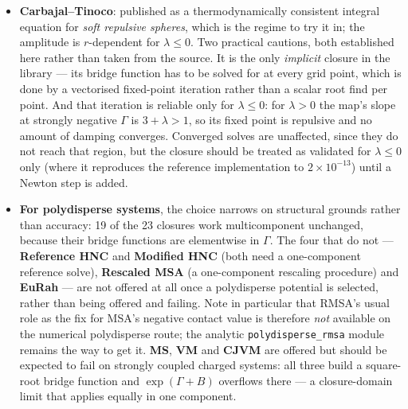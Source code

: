 \documentclass[11pt,a4paper]{article}
\newcommand{\code}[1]{\texttt{#1}}
\begin{document}
\begin{itemize}[nosep]
    RY \emph{exactly} (verified here to $2.5\times10^{-16}$). Its value is
    precisely that second degree of freedom: where RY's own consistency
    search finds no root -- which happens, since the residual is often
    monotone and already nonzero in the PY limit
    (Section~\ref{sec:alpha}) -- the extra parameter gives the search
    somewhere else to go. Use it as the first fallback when Rogers--Young
    cannot be made consistent for a given system.
  \item \textbf{Carbajal--Tinoco}: published as a thermodynamically
    consistent integral equation for \emph{soft repulsive spheres}, which is
    the regime to try it in; the amplitude is $r$-dependent for
    $\lambda\le0$. Two practical cautions, both established here rather than
    taken from the source. It is the only \emph{implicit} closure in the
    library --- its bridge function has to be solved for at every grid point,
    which is done by a vectorised fixed-point iteration rather than a scalar
    root find per point. And that iteration is reliable only for
    $\lambda\le0$: for $\lambda>0$ the map's slope at strongly negative
    $\Gamma$ is $3+\lambda>1$, so its fixed point is repulsive and no amount
    of damping converges. Converged solves are unaffected, since they do not
    reach that region, but the closure should be treated as validated for
    $\lambda\le0$ only (where it reproduces the reference implementation to
    $2\times10^{-13}$) until a Newton step is added.
  \item \textbf{For polydisperse systems}, the choice narrows on structural
    grounds rather than accuracy: 19 of the 23 closures work multicomponent
    unchanged, because their bridge functions are elementwise in $\Gamma$.
    The four that do not --- \textbf{Reference HNC} and \textbf{Modified HNC}
    (both need a one-component reference solve), \textbf{Rescaled MSA} (a
    one-component rescaling procedure) and \textbf{EuRah} --- are not offered
    at all once a polydisperse potential is selected, rather than being
    offered and failing. Note in particular that RMSA's usual role as the fix
    for MSA's negative contact value is therefore \emph{not} available on the
    numerical polydisperse route; the analytic \code{polydisperse\_rmsa}
    module remains the way to get it. \textbf{MS}, \textbf{VM} and
    \textbf{CJVM} are offered but should be expected to fail on strongly
    coupled charged systems: all three build a square-root bridge function
    and $\exp(\Gamma+B)$ overflows there --- a closure-domain limit that
    applies equally in one component.
\end{itemize}
\end{document}
